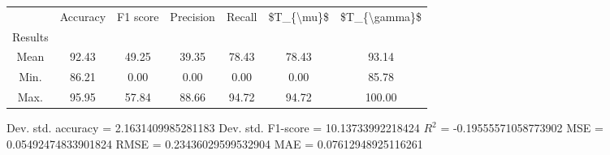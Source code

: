 \begin{tabular}{|c|c|c|c|c|c|c|}
\toprule
{} &  Accuracy &  F1 score &  Precision &  Recall &  \$T\_\{\textbackslash mu\}\$ &  \$T\_\{\textbackslash gamma\}\$ \\
Results &           &           &            &         &            &               \\
\hline
Mean    &     92.43 &     49.25 &      39.35 &   78.43 &      78.43 &         93.14 \\
Min.    &     86.21 &      0.00 &       0.00 &    0.00 &       0.00 &         85.78 \\
Max.    &     95.95 &     57.84 &      88.66 &   94.72 &      94.72 &        100.00 \\
\bottomrule
\end{tabular}

 Dev. std. accuracy = 2.1631409985281183
 Dev. std. F1-score = 10.13733992218424
 $R^2$ = -0.19555571058773902
 MSE = 0.05492474833901824
 RMSE = 0.23436029599532904
 MAE = 0.07612948925116261